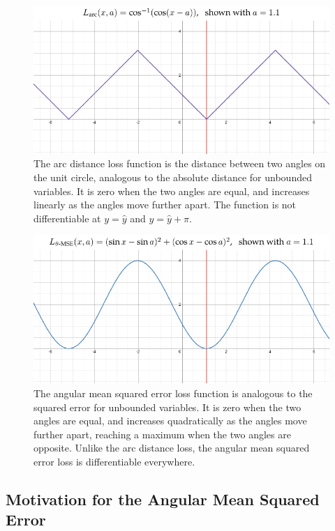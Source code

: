 \begin{figure}
    \centering
    \includegraphics[width=0.9\linewidth]{figures/loss-arc.pdf}
    \captionsetup{parskip=7pt}
    \caption[Arc distance loss]{The arc distance loss function is the distance between two angles on the unit circle, analogous to the absolute distance for unbounded variables. It is zero when the two angles are equal, and increases linearly as the angles move further apart. The function is not differentiable at $y = \hat{y}$ and $y = \hat{y} + \pi$.}
    \hrulefill
    \label{fig:loss-arc}
\end{figure}
\begin{figure}
    \centering
    \includegraphics[width=0.9\linewidth]{figures/loss-amse.pdf}
    \captionsetup{parskip=7pt}
    \caption[Angular mean squared error loss]{The angular mean squared error loss function is analogous to the squared error for unbounded variables. It is zero when the two angles are equal, and increases quadratically as the angles move further apart, reaching a maximum when the two angles are opposite. Unlike the arc distance loss, the angular mean squared error loss is differentiable everywhere.}
    \label{fig:loss-amse}
\end{figure}

\clearpage


\subsection{Motivation for the Angular Mean Squared Error}
\label{ss:amse-motivation}

